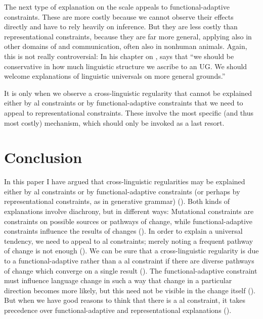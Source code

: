 \documentclass[output=paper]{langsci/langscibook}
\begin{document}
The next type of explanation on the scale appeals to functional-adaptive constraints. These are more costly because we cannot observe their effects directly and have to rely heavily on inference. But they are less costly than representational constraints, because they are far more general, applying also in other domains of   and communication, often also in nonhuman animals. Again, this is not really controversial: In his chapter on , \citet[79]{Jackendoff2002} says that “we should be conservative in how much linguistic structure we ascribe to an  UG. We should welcome explanations of linguistic universals on more general  grounds.”

It is only when we observe a cross-linguistic regularity that cannot be explained either by al constraints or by functional-adaptive constraints that we need to appeal to representational constraints. These involve the most specific (and thus most costly) mechanism, which should only be invoked as a last resort.

\section{Conclusion}\label{sec:haspelmath:8}

In this paper I have argued that cross-linguistic regularities may be explained either by al constraints or by functional-adaptive constraints (or perhaps by representational constraints, as in generative grammar) (). Both kinds of explanations involve diachrony, but in different ways: Mutational constraints are constraints on possible sources or pathways of change, while functional-adaptive constraints influence the results of changes (). In order to explain a universal tendency, we need to appeal to al constraints; merely noting a frequent pathway of change is not enough (). We can be sure that a cross-linguistic regularity is due to a functional-adaptive rather than a al constraint if there are diverse pathways of change which converge on a single result (). The functional-adaptive constraint must influence language change in such a way that change in a particular direction becomes more likely, but this need not be visible in the change itself (). But when we have good reasons to think that there is a al constraint, it takes precedence over functional-adaptive and representational explanations ().
\end{document}
